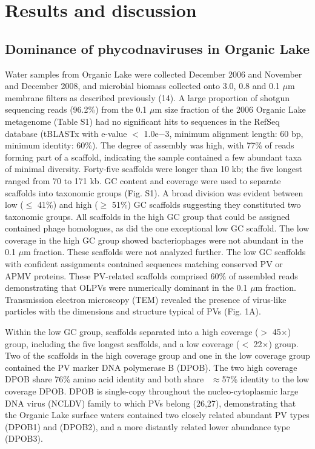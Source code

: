 \section{Results and discussion}
\subsection{Dominance of phycodnaviruses in Organic Lake}
Water samples from Organic Lake were collected December 2006 and November and December 2008, and microbial biomass collected onto 3.0, 0.8 and 0.1 $\mu$m membrane filters as described previously (14). 
A large proportion of shotgun sequencing reads (96.2\%) from the 0.1 $\mu$m size fraction of the 2006 Organic Lake metagenome (Table S1) had no significant hits to sequences in the RefSeq database 
(tBLASTx with e-value $<$ 1.0e$-$3, minimum alignment length: 60 bp, minimum identity: 60\%). 
The degree of assembly was high, with 77\% of reads forming part of a scaffold, indicating the sample contained a few abundant taxa of minimal diversity. 
Forty-five scaffolds were longer than 10 kb; the five longest ranged from 70 to 171 kb. 
GC content and coverage were used to separate scaffolds into taxonomic groups (Fig. S1). 
A broad division was evident between low ($\le$ 41\%) and high ($\ge$ 51\%) GC scaffolds suggesting they constituted two taxonomic groups. 
All scaffolds in the high GC group that could be assigned contained phage homologues, as did the one exceptional low GC scaffold. 
The low coverage in the high GC group showed bacteriophages were not abundant in the 0.1 $\mu$m fraction. 
These scaffolds were not analyzed further. 
The low GC scaffolds with confident assignments contained sequences matching conserved PV or APMV proteins. 
These PV-related scaffolds comprised 60\% of assembled reads demonstrating that OLPVs were numerically dominant in the 0.1 $\mu$m fraction. 
Transmission electron microscopy (TEM) revealed the presence of virus-like particles with the dimensions and structure typical of PVs (Fig. 1A).

Within the low GC group, scaffolds separated into a high coverage ($>$ 45$\times$) group, including the five longest scaffolds, and a low coverage ($<$ 22$\times$) group. 
Two of the scaffolds in the high coverage group and one in the low coverage group contained the PV marker DNA polymerase B (DPOB). 
The two high coverage DPOB share 76\% amino acid identity and both share ~$\approx$57\% identity to the low coverage DPOB. 
DPOB is single-copy throughout the nucleo-cytoplasmic large DNA virus (NCLDV) family to which PVs belong (26,27), 
demonstrating that the Organic Lake surface waters contained two closely related abundant PV types (DPOB1) and (DPOB2), and a more distantly related lower abundance type (DPOB3). 

